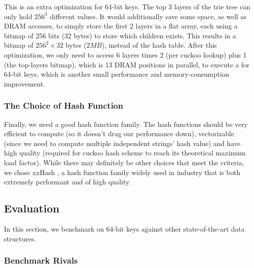 \documentclass[11pt, usletter]{article}
\begin{document}
This is an extra optimization for 64-bit keys.
The top 3 layers of the trie tree can only hold $256^3$ different values. 
It would additionally save some space, as well as DRAM accesses, to simply store the first 2 layers
in a flat array, each using a bitmap of 256 bits (32 bytes) to store which children exists. 
This results in a bitmap of $256^2\times 32$ bytes ($2MB$), instead of the hash table. 
After this optimization, we only need to access 6 layers times 2 (per cuckoo lookup) plus 1 (the top-layers bitmap), 
which is 13 DRAM positions in parallel, to execute a \QueryLCP for 64-bit keys, 
which is another small performance and memory-consumption improvement.
 
\subsubsection*{The Choice of Hash Function}

Finally, we need a good hash function family.
The hash functions should be very efficient to compute (so it doesn't drag our performance down), 
vectorizable (since we need to compute multiple independent strings' hash value) 
and have high quality (required for cuckoo hash scheme to reach its theoretical maximum load factor).
While there may definitely be other choices that meet the criteria, 
we chose xxHash \cite{xxhash}, 
a hash function family widely used in industry that is both extremely performant and of high quality.

\subsection{Evaluation} \label{mlpindex_eval}

In this section, we benchmark \MlpIndex on 64-bit keys against other state-of-the-art data structures. 

\subsubsection*{Benchmark Rivals}
\end{document}
